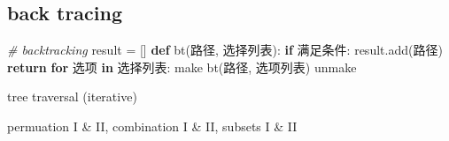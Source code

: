 \documentclass[
]{article}
\newenvironment{Shaded}{}{}
\newcommand{\CommentTok}[1]{\textcolor[rgb]{0.38,0.63,0.69}{\textit{#1}}}
\newcommand{\ControlFlowTok}[1]{\textcolor[rgb]{0.00,0.44,0.13}{\textbf{#1}}}
\newcommand{\KeywordTok}[1]{\textcolor[rgb]{0.00,0.44,0.13}{\textbf{#1}}}
\newcommand{\NormalTok}[1]{#1}
\newcommand{\OperatorTok}[1]{\textcolor[rgb]{0.40,0.40,0.40}{#1}}
\begin{document}
\hypertarget{back-tracing}{%
\subsection{back tracing}\label{back-tracing}}

\begin{Shaded}
\begin{Highlighting}[]
\CommentTok{\# backtracking}
\NormalTok{result }\OperatorTok{=}\NormalTok{ []}
\KeywordTok{def}\NormalTok{ bt(路径, 选择列表):}
    \ControlFlowTok{if}\NormalTok{ 满足条件:}
\NormalTok{        result.add(路径)}
        \ControlFlowTok{return}
   	\ControlFlowTok{for}\NormalTok{ 选项 }\KeywordTok{in}\NormalTok{ 选择列表:}
\NormalTok{        make}
\NormalTok{        bt(路径, 选项列表)}
\NormalTok{        unmake}
\end{Highlighting}
\end{Shaded}

tree traversal (iterative)

permuation I \& II, combination I \& II, subsets I \& II
\end{document}

